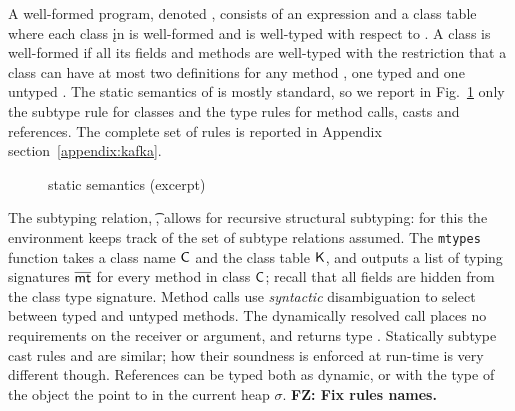 \documentclass[acmlarge, anonymous, authordraft]{acmart}
\newcommand{\FZ}[1]{\textbf{FZ: #1}}
\begin{document}
 A well-formed program, denoted \WFp\e\K, consists of an expression \e and a
class table \K where each class \k in \K is well-formed and \e is well-typed
with respect to \K.  A class is well-formed if all its fields and methods
are well-typed with the restriction that a class can have at most two
definitions for any method \m, one typed \Mdef\m\x\C\D\e and one untyped
\Mdef\m\x\any\any\e.  The static semantics of \kafka is mostly standard,
so we report in Fig.~\ref{f:staticsem} only the subtype rule for classes and the type rules for method calls, casts and references.
The complete
set of rules is reported in Appendix section~\ref{appendix:kafka}.  


\begin{figure}[!t]
\hrulefill

{\small
\begin{mathpar}






\end{mathpar}}
\hrulefill
\caption{\kafka static semantics (excerpt)}\label{f:staticsem}
\end{figure}

The
subtyping relation, \StrSub\M\K\t\tp, allows for recursive structural
subtyping: for this the environment \M keeps track of the set of subtype relations assumed.  The \texttt{mtypes} function takes a class name $\C$ and the class table
$\K$, and outputs a list of typing signatures $\b\mt$ for every method in
class $\C$; recall that all fields are hidden from the class type signature. 
Method calls use \emph{syntactic} disambiguation to select between
typed and untyped methods. The dynamically resolved call places no
requirements on the receiver or argument, and returns type \any. 
Statically subtype cast rules  and  are similar; how their soundness is enforced at run-time is very different though.  References can be typed both as dynamic, or with the type of the object the point to in the current heap \(\sigma\).   \FZ{Fix rules names.}
\end{document}
